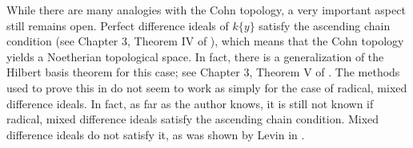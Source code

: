While there are many analogies with the Cohn topology, a very important aspect still remains open. Perfect difference ideals of $k\{y\}$ satisfy the ascending chain condition (see Chapter 3, Theorem IV of \cite{cohn}), which means that the Cohn topology yields a Noetherian topological space.
In fact, there is a generalization of the Hilbert basis theorem for this case; see Chapter 3, Theorem V of \cite{cohn}. The methods used to prove this in \cite{cohn} do not seem to work as simply for the case of radical, mixed difference ideals.
In fact, as far as the author knows, it is still not known if radical, mixed difference ideals satisfy the ascending chain condition. Mixed difference ideals do not satisfy it, as was shown by Levin in \cite{levinmixed}.




